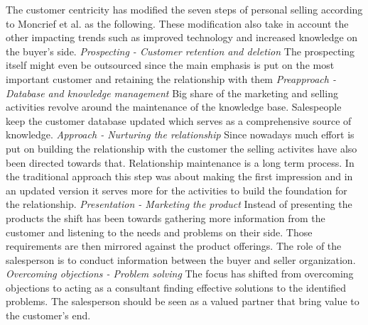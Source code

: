 \documentclass[12pt,a4paper,oneside,pdftex]{report}
\begin{document}
{{The customer centricity has modified the seven steps of personal selling according to Moncrief et al. as the following. These modification also take in account the other impacting trends such as improved technology and increased knowledge on the buyer's side. \newline \newline \emph{Prospecting - Customer retention and deletion}\newline 
The prospecting itself might even be outsourced since the main emphasis is put on the most important customer and retaining the relationship with them \citep{Moncrief}\newline \newline
\emph{Preapproach - Database and knowledge management}\newline 
Big share of the marketing and selling activities revolve around the maintenance of the knowledge base. Salespeople keep the customer database updated which serves as a comprehensive source of knowledge. \citep{Moncrief}\newline \newline
\emph{Approach - Nurturing the relationship}\newline
Since nowadays much effort is put on building the relationship with the customer the selling activites have also been directed towards that. Relationship maintenance is a long term process. In the traditional approach this step was about making the first impression and in an updated version it serves more for the activities to build the foundation for the relationship. \citep{Moncrief} \newline \newline
\emph{Presentation - Marketing the product}\newline
Instead of presenting the products the shift has been towards gathering more information from the customer and listening to the needs and problems on their side. Those requirements are then mirrored against the product offerings. The role of the salesperson is to conduct information between the buyer and seller organization.   \citep{Moncrief}\newline \newline
\emph{Overcoming objections - Problem solving}\newline
The focus has shifted from overcoming objections to acting as a consultant finding effective solutions to the identified problems. The salesperson should be seen as a valued partner that bring value to the customer's end. \citep{Moncrief}\newline \newline
}}
\end{document}
